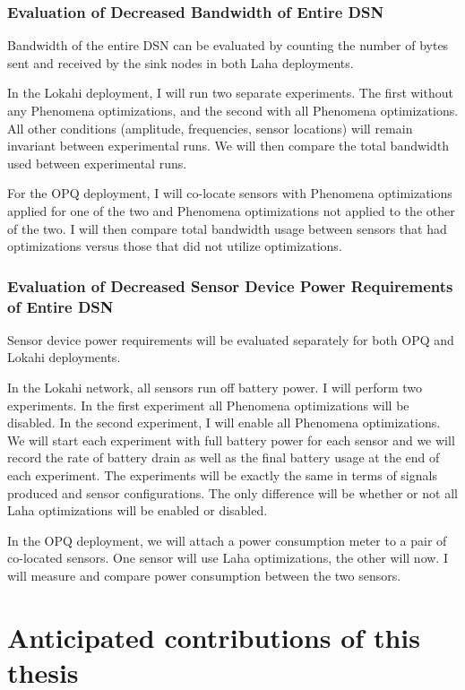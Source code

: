 \subsubsection{Evaluation of Decreased Bandwidth of Entire DSN}
Bandwidth of the entire DSN can be evaluated by counting the number of bytes sent and received by the sink nodes in both Laha deployments. 

In the Lokahi deployment, I will run two separate experiments. The first without any Phenomena optimizations, and the second with all Phenomena optimizations. All other conditions (amplitude, frequencies, sensor locations) will remain invariant between experimental runs. We will then compare the total bandwidth used between experimental runs.

For the OPQ deployment, I will co-locate sensors with Phenomena optimizations applied for one of the two and Phenomena optimizations not applied to the other of the two. I will then compare total bandwidth usage between sensors that had optimizations versus those that did not utilize optimizations.

\subsubsection{Evaluation of Decreased Sensor Device Power Requirements of Entire DSN}
Sensor device power requirements will be evaluated separately for both OPQ and Lokahi deployments. 

In the Lokahi network, all sensors run off battery power. I will perform two experiments. In the first experiment all Phenomena optimizations will be disabled. In the second experiment, I will enable all Phenomena optimizations. We will start each experiment with full battery power for each sensor and we will record the rate of battery drain as well as the final battery usage at the end of each experiment. The experiments will be exactly the same in terms of signals produced and sensor configurations. The only difference will be whether or not all Laha optimizations will be enabled or disabled. 

In the OPQ deployment, we will attach a power consumption meter to a pair of co-located sensors. One sensor will use Laha optimizations, the other will now. I will measure and compare power consumption between the two sensors. 

\section{Anticipated contributions of this thesis}
